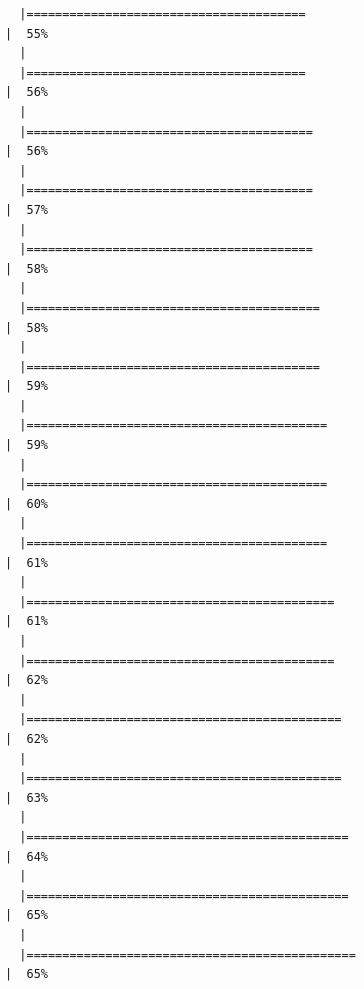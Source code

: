 \documentclass[
  letterpaper,
  DIV=11,
  numbers=noendperiod]{scrreprt}
\begin{document}
\begin{verbatim}
  |=======================================                               |  55%
  |                                                                            
  |=======================================                               |  56%
  |                                                                            
  |========================================                              |  56%
  |                                                                            
  |========================================                              |  57%
  |                                                                            
  |========================================                              |  58%
  |                                                                            
  |=========================================                             |  58%
  |                                                                            
  |=========================================                             |  59%
  |                                                                            
  |==========================================                            |  59%
  |                                                                            
  |==========================================                            |  60%
  |                                                                            
  |==========================================                            |  61%
  |                                                                            
  |===========================================                           |  61%
  |                                                                            
  |===========================================                           |  62%
  |                                                                            
  |============================================                          |  62%
  |                                                                            
  |============================================                          |  63%
  |                                                                            
  |=============================================                         |  64%
  |                                                                            
  |=============================================                         |  65%
  |                                                                            
  |==============================================                        |  65%

\end{verbatim}
\end{document}
